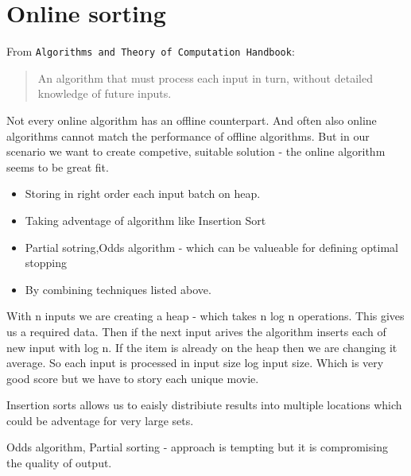 \section*{Online sorting}
From \texttt{Algorithms and Theory of Computation Handbook}:
\begin{quote}
An algorithm that must process each input in turn, without detailed knowledge
of future inputs.
\end{quote}

Not every online algorithm has an offline counterpart. And often also online
algorithms cannot match the performance of offline algorithms.
But in our scenario we want to create competive, suitable solution - the online
algorithm seems to be great fit.

\begin{itemize}
	\item{Storing in right order each input batch on heap.}
	\item{Taking adventage of algorithm like Insertion Sort}
	\item{Partial sotring,Odds algorithm - which can be valueable for defining optimal stopping}
  \item{By combining techniques listed above. }
\end{itemize}

With n inputs we are creating a heap - which takes n log n operations. This gives
us a required data. Then if the next input arives the algorithm inserts each
of new input with log n. If the item is already on the heap then we are changing
it average. So each input is processed in input size log input size.
Which is very good score but we have to story each unique movie.

Insertion sorts allows us to eaisly distribiute results into multiple locations
which could be adventage for very large sets.

Odds algorithm, Partial sorting - approach is tempting but it is compromising
the quality of output.  
